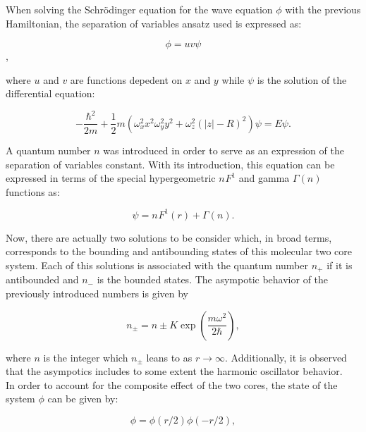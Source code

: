 \documentclass[openany]{book}
\begin{document}
When solving the Schrödinger equation for the wave equation $\phi$ with the previous Hamiltonian, the separation of variables ansatz used is expressed as: 

\begin{equation}\label{eq:micro_twoCenterShell_anzats}
	\phi = u v \psi
\end{equation},

where $u$ and $v$ are functions depedent on $x$ and $y$ while $\psi$ is the solution of the differential equation: 

\begin{equation}\label{eq:micro_twoCenterShell_differentialEquation}
	-\frac{\hbar^2}{2m} + \frac{1}{2}m (\omega^2_x  x^2  \omega^2_y y^2 + \omega^2_z (|z| - R)^2) \psi = E \psi.
\end{equation}

A quantum number $n$ was introduced in order to serve as an expression of the separation of variables constant. With its introduction, this equation can be expressed in terms of the special hypergeometric ${n}^{}F^{1}$ and gamma $\Gamma(n)$ functions as:

\begin{equation}\label{eq:micro_twoCenterShell_solution_specialFunctions}
	\psi = {n}^{}F^{1} (r) + \Gamma(n).
\end{equation}

Now, there are actually two solutions to be consider which, in broad terms, corresponds to the bounding and antibounding states of this molecular two core system. Each of this solutions is associated with the quantum number $n_+$ if it is antibounded and $n_-$ is the bounded states. The asympotic behavior of the previously introduced numbers is given by 

\begin{equation}\label{eq:micro_twoCenterShell_solution_asymptotic}
	n_\pm = n \pm K \exp {\left(\frac{m\omega^2}{2\hbar }\right)},
\end{equation}

where $n$ is the integer which $n_\pm$ leans to as $r \rightarrow \infty$. Additionally, it is observed that the asympotics includes to some extent the harmonic oscillator behavior. \\

In order to account for the composite effect of the two cores, the state of the system $\phi$ can be given by: 

\begin{equation} \label{eq:micro_twoCenterShell_solution_system}
	\phi = \phi(r/2) \phi(-r/2),
\end{equation}
\end{document}
